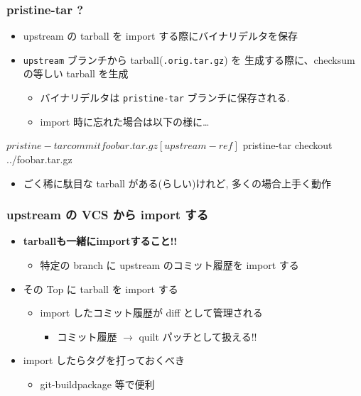 \documentclass[10pt,final,c,dvipdfmx,cjk,colorlinks=false]{beamer}
\providecommand{\alert}[1]{\textbf{#1}}
\begin{document}
\begin{frame}
\frametitle{pristine-tar ?}
\label{sec-2-3}


\begin{itemize}
\item upstream の tarball を import する際にバイナリデルタを保存
\item \texttt{upstream} ブランチから tarball(\texttt{.orig.tar.gz}) を
  生成する際に、checksum の等しい tarball を生成
\begin{itemize}
\item バイナリデルタは \texttt{pristine-tar} ブランチに保存される.
\item import 時に忘れた場合は以下の様に\ldots{}
\end{itemize}
\end{itemize}
\begin{commandline}
  $ pristine-tar commit foobar.tar.gz [upstream-ref]
  $ pristine-tar checkout ../foobar.tar.gz
\end{commandline}

\begin{itemize}
\item ごく稀に駄目な tarball がある(らしい)けれど, 多くの場合上手く動作
\end{itemize}
\end{frame}
\begin{frame}
\frametitle{upstream の VCS から import する}
\label{sec-2-4}


\begin{itemize}
\item \alert{\textbf{tarballも一緒にimportすること!!}}
\begin{itemize}
\item 特定の branch に upstream のコミット履歴を import する
\end{itemize}
\item その Top に tarball を import する
\begin{itemize}
\item import したコミット履歴が diff として管理される
\begin{itemize}
\item コミット履歴 $\to$ quilt パッチとして扱える!!
\end{itemize}
\end{itemize}
\item import したらタグを打っておくべき
\begin{itemize}
\item git-buildpackage 等で便利
\end{itemize}
\end{itemize}
\end{frame}
\end{document}
